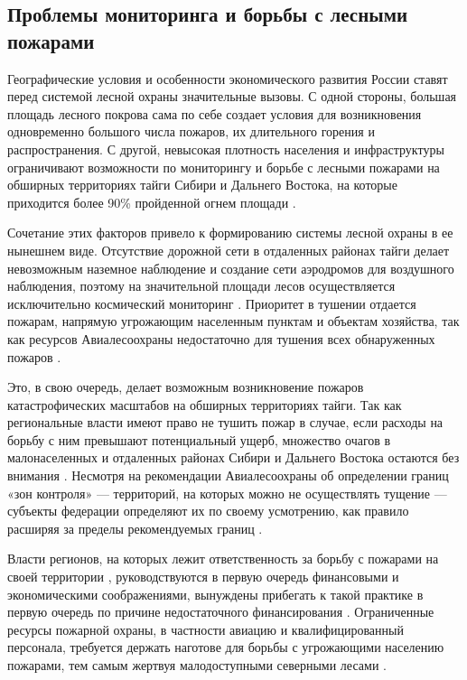 \documentclass[a4paper,article,14pt]{extarticle}
\begin{document}
\subsection{Проблемы мониторинга и борьбы с лесными пожарами}
  
Географические условия и особенности экономического развития России ставят перед системой лесной охраны значительные вызовы. С одной стороны, большая площадь лесного покрова сама по себе создает условия для возникновения одновременно большого числа пожаров, их длительного горения и распространения. С другой, невысокая плотность населения и инфраструктуры ограничивают возможности по мониторингу и борьбе с лесными пожарами на обширных территориях тайги Сибири и Дальнего Востока, на которые приходится более 90\% пройденной огнем площади \cite{PonomarevChapter10System2015}.

Сочетание этих факторов привело к формированию системы лесной охраны в ее нынешнем виде. Отсутствие дорожной сети в отдаленных районах тайги делает невозможным наземное наблюдение и создание сети аэродромов для воздушного наблюдения, поэтому на значительной площади лесов осуществляется исключительно космический мониторинг \cite{PonomarevChapter10System2015}. Приоритет в тушении отдается пожарам, напрямую угрожающим населенным пунктам и объектам хозяйства, так как ресурсов Авиалесоохраны недостаточно для тушения всех обнаруженных пожаров \cite{KosmicheskiyMonitoringLesnyh2019}. 

Это, в свою очередь, делает возможным возникновение пожаров катастрофических масштабов на обширных территориях тайги. Так как региональные власти имеют право не тушить пожар в случае, если расходы на борьбу с ним превышают потенциальный ущерб, множество очагов в малонаселенных и отдаленных районах Сибири и Дальнего Востока остаются без внимания \cite{KtoKontroliruetPozhary2019}. Несмотря на рекомендации Авиалесоохраны об определении границ «зон контроля» — территорий, на которых можно не осуществлять тущение — субъекты федерации определяют их по своему усмотрению, как правило расширяя за пределы рекомендуемых границ \cite{KosmicheskiyMonitoringLesnyh2019}.

Власти регионов, на которых лежит ответственность за борьбу с пожарами на своей территории \cite{KosmicheskiyMonitoringLesnyh2019}, руководствуются в первую очередь финансовыми и экономическими соображениями, вынуждены прибегать к такой практике в первую очередь по причине недостаточного финансирования \cite{GreenpeacePravitelstvuNuzhno2021}. Ограниченные ресурсы пожарной охраны, в частности авиацию и квалифицированный персонала, требуется держать наготове для борьбы с угрожающими населению пожарами, тем самым жертвуя малодоступными северными лесами \cite{ZonKontrolyaStanet2022}. 
\end{document}
